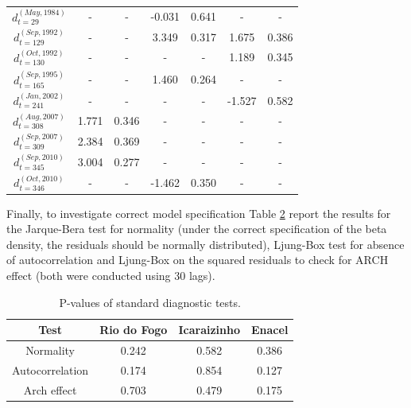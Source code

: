 \documentclass[a4paper]{IEEEtran}
\begin{document}
\begin{table}[htbp]
\begin{tabular}{ccccccc}
$d_{t=29}^{(May, 1984)}$   & -          & -         & -0.031      & 0.641     & -          & -     \\
$d_{t=129}^{(Sep, 1992)}$  & -          & -         & 3.349      & 0.317     & 1.675      & 0.386     \\
$d_{t=130}^{(Oct, 1992)}$  & -          & -         & -          & -         & 1.189      & 0.345     \\
$d_{t=165}^{(Sep, 1995)}$  & -          & -         & 1.460      & 0.264     & -          & -     \\
$d_{t=241}^{(Jan, 2002)}$  & -          & -         & -          & -         &-1.527      & 0.582     \\
$d_{t=308}^{(Aug, 2007)}$  & 1.771      & 0.346     & -          & -         & -          & -         \\
$d_{t=309}^{(Sep, 2007)}$  & 2.384      & 0.369     & -          & -         & -          & -         \\
$d_{t=345}^{(Sep, 2010)}$  & 3.004      & 0.277     & -          & -         & -          & -         \\
$d_{t=346}^{(Oct, 2010)}$  & -          & -         & -1.462     & 0.350     & -          & - \\\hline
\end{tabular}
\label{table1}
\end{table}

Finally, to investigate correct model specification Table \ref{table2} report the results for the Jarque-Bera test for normality (under the correct specification of the beta density, the residuals should be normally distributed), Ljung-Box test for absence of autocorrelation and Ljung-Box on the squared residuals to check for ARCH effect (both were conducted using 30 lags).  

\begin{table}[htbp]
\centering
\caption{P-values of standard diagnostic tests.}
\begin{tabular}{c|ccc}
\hline
{\bf Test}      & {\bf Rio do Fogo} & {\bf Icaraizinho} & {\bf Enacel} \\ \hline
Normality       & 0.242             & 0.582            & 0.386        \\
Autocorrelation & 0.174             & 0.854           & 0.127        \\
Arch effect           & 0.703             & 0.479            & 0.175      \\ \hline
\end{tabular}
\label{table2}
\end{table}
\end{document}
